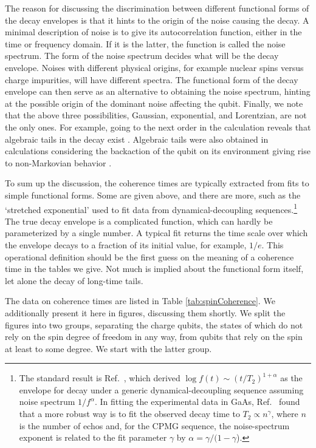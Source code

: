 \documentclass[aps, prx, showpacs, twocolumn, superscriptaddress, notitlepage, longbibliography, floatfix, nofootinbib]{revtex4-2}
\newcommand{\separate}[1]
{
 #1
}
\begin{document}
The reason for discussing the discrimination between different functional forms of the decay envelopes is that it hints to the origin of the noise causing the decay. A minimal description of noise is to give its autocorrelation function, either in the time or frequency domain. If it is the latter, the function is called the noise spectrum. The form of the noise spectrum decides what will be the decay envelope. Noises with different physical origins, for example nuclear spins versus charge impurities, will have different spectra. The functional form of the decay envelope can then serve as an alternative to obtaining the noise spectrum, hinting at the possible origin of the dominant noise affecting the qubit. Finally, we note that the above three possibilities, Gaussian, exponential, and Lorentzian, are not the only ones. For example, going to the next order in the calculation reveals that algebraic tails in the decay exist \cite{ithier_decoherence_2005}. Algebraic tails were also obtained in calculations considering the backaction of the qubit on its environment giving rise to non-Markovian behavior \cite{fischer_dealing_2009}. 

To sum up the discussion, the coherence times are typically extracted from fits to simple functional forms. Some are given above, and there are more, such as the  `stretched exponential' used to fit data from dynamical-decoupling sequences.\footnote{The standard result is Ref.~\cite{cywinski_how_2008}, which derived $\log f(t) \sim (t/T_2)^{1+\alpha}$ as the envelope for decay under a generic dynamical-decoupling sequence assuming noise spectrum $1/f^\alpha$. In fitting the experimental data in GaAs, Ref.~\cite{medford_scaling_2012} found that a more robust way is to fit the observed decay time to $T_2 \propto n^\gamma$, where $n$ is the number of echos and, for the CPMG sequence, the noise-spectrum exponent is related to the fit parameter $\gamma$ by $\alpha=\gamma/(1-\gamma$).} The true decay envelope is a complicated function, which can hardly be parameterized by a single number. A typical fit returns the time scale over which the envelope decays to a fraction of its initial value, for example, $1/e$. This operational definition should be the first guess on the meaning of a coherence time in the tables we give. Not much is implied about the functional form itself, let alone the decay of long-time tails. 

\separate{The data on coherence times are listed in 
Table \ref{tab:spinCoherence}. 
We additionally present it here in figures, discussing them shortly. We split the figures into two groups, separating the charge qubits, the states of which do not rely on the spin degree of freedom in any way, from qubits that rely on the spin at least to some degree. We start with the latter group.}
\end{document}
